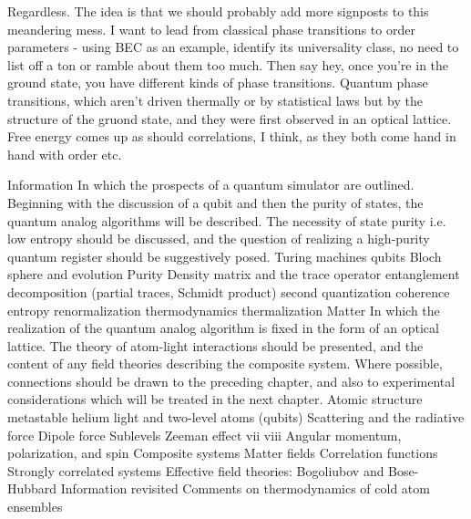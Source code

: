 Regardless. The idea is that we should probably add more signposts to
this meandering mess. I want to lead from classical phase transitions to
order parameters - using BEC as an example, identify its universality
class, no need to list off a ton or ramble about them too much. Then say
hey, once you're in the ground state, you have different kinds of phase
transitions. Quantum phase transitions, which aren't driven thermally or
by statistical laws but by the structure of the gruond state, and they
were first observed in an optical lattice. Free energy comes up as
should correlations, I think, as they both come hand in hand with order
etc.


Information In which the prospects of a quantum simulator are outlined. Beginning
with the discussion of a qubit and then the purity of states, the quantum analog
algorithms will be described. The necessity of state purity i.e. low entropy should
be discussed, and the question of realizing a high-purity quantum register should be
suggestively posed.
 Turing machines
 qubits
 Bloch sphere and evolution
 Purity
 Density matrix and the trace operator
 entanglement
 decomposition (partial traces, Schmidt product)
 second quantization
 coherence
 entropy
 renormalization
 thermodynamics
 thermalization
Matter In which the realization of the quantum analog algorithm is fixed in the form of
an optical lattice. The theory of atom-light interactions should be presented, and
the content of any field theories describing the composite system. Where possible,
connections should be drawn to the preceding chapter, and also to experimental
considerations which will be treated in the next chapter.
 Atomic structure
 metastable helium
 light and two-level atoms (qubits)
 Scattering and the radiative force
 Dipole force
 Sublevels
 Zeeman effect
vii
viii
 Angular momentum, polarization, and spin
 Composite systems
 Matter fields
 Correlation functions
 Strongly correlated systems
 Effective field theories: Bogoliubov and Bose-Hubbard
 Information revisited
 Comments on thermodynamics of cold atom ensembles
